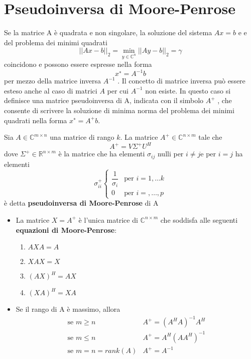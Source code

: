 \section{Pseudoinversa di Moore-Penrose}
Se la matrice A \`e quadrata e non singolare, la soluzione del
 sistema $Ax = b$ e e del problema dei minimi quadrati
$$|| Ax − b ||_{2} = \displaystyle \min_{y \in
\mathbb{C}^{n}} || Ay − b||_{2} = \gamma$$ coincidono 
e possono essere espresse nella forma
$$x^∗ = A^{−1} b$$
per mezzo della matrice inversa $A^{−1}$ . Il concetto di matrice
 inversa pu\`o essere esteso anche al caso di matrici $A$ per cui
 $A^{-1}$ non esiste. In questo caso si definisce una matrice
 pseudoinversa di A, indicata con il simbolo
$A^{+}$ , che consente di scrivere la soluzione di minima norma 
del problema dei minimi quadrati nella forma
$x^{∗} = A^+ b$.

\begin{defn}
  Sia $A \in \mathbb{C}^{m \times n}$ una matrice di rango $k$. La matrice
$A^{+} \in  \mathbb{C}^{n \times m}$ tale che
$$A^{+} = V \Sigma^{+} U^H$$
dove $\Sigma^+ \in \mathbb{R}^{n \times m}$ \`e  la matrice che ha 
elementi $\sigma_{ij}$ nulli per $i \neq j $e per $i = j$
ha elementi
$$
\sigma_{ii}^{+}
\left\{
\begin{array}{lc}
\dfrac{1}{\sigma_i} & \text{per } i=1,\ldots k \\
0  & \text{per } i=,\ldots, p
\end{array}
\right.
$$
\`e detta \textbf{pseudoinversa di Moore-Penrose} di A
\end{defn}
\begin{property}
  \begin{itemize}
  \item 
 La matrice $X = A^+$ \`e  l'unica matrice di 
$\mathbb{C}^{n \times m}$ che soddisfa alle seguenti
\textbf{equazioni di Moore-Penrose}:
\begin{enumerate}
\item  $AXA = A$
\item $XAX = X$
\item $(AX)^H = AX$
\item $(XA)^H = XA$
\end{enumerate}


\item Se il rango di A \`e massimo, allora
$$
\begin{array}{ll}
 \text{se } m \geq n & A^{+} = (A^{H}A)^{-1}A^{H} \\ 
 \text{se } m \leq n &  A^{+} =  A^{H}(AA^{H})^{-1} \\ 
 \text{se } m =n = rank(A) & A^{+} =A^{-1}
\end{array}
$$
  \end{itemize}

\end{property}

